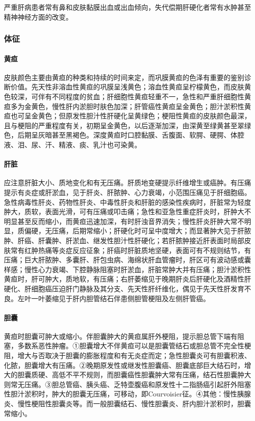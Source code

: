 严重肝病患者常有鼻和皮肤黏膜出血或出血倾向，失代偿期肝硬化者常有水肿甚至精神神经方面的改变。

\subsubsection{体征}

\paragraph{黄疸}

皮肤颜色主要由黄疸的种类和持续的时间来定，而巩膜黄疸的色泽有重要的鉴别诊断价值。先天性非溶血性黄疸的巩膜呈浅黄色；溶血性黄疸呈柠檬黄色，而皮肤黄色较深，可伴有不同程度的贫血；肝细胞性黄疸轻重不一，急性和严重肝细胞性黄疸多为金黄色，慢性肝内淤胆时肤色加深；肝管癌性黄疸呈金黄色；胆汁淤积性黄疸也可呈金黄色；但原发性胆汁性肝硬化呈黄绿色；梗阻性黄疸的皮肤颜色最深，且与梗阻的严重程度有关，初期呈金黄色，以后逐渐加深，由深黄至绿黄甚至翠绿色，后期呈灰暗甚至黑褐色。深度黄疸时口腔黏膜、舌腹面、软腭、硬腭、体腔液、泪、尿、汗、精液、痰、乳汁也可染黄。

\paragraph{肝脏}

应注意肝脏大小、质地变化和有无压痛。肝质地变硬提示纤维增生或癌肿。有压痛提示有炎症或肝淤血，见于肝炎、肝脓肿、心力衰竭，小范围压痛见于肝细胞癌。急性病毒性肝炎、药物性肝炎、中毒性肝炎和肝脏的感染性疾病时，肝脏常为轻度肿大，质软，表面光滑，可有压痛或叩击痛；急性和亚急性重症肝炎时，肝肿大不明显甚至反而缩小，而黄疸迅速加深，有时肝浊音界消失；慢性肝炎肝肿大常不明显，质偏硬，无压痛，后期常缩小；肝硬化时可呈中度增大；而显著肿大见于肝脓肿、肝癌、肝囊肿、肝淤血、继发性胆汁性肝硬化；若肝脓肿接近肝表面时局部皮肤常有红肿热痛等炎症反应征象；肝癌时肝脏质地坚硬，表面可有不规则结节，有压痛；巨大肝脓肿、多囊肝、肝包虫病、海绵状肝血管瘤时，肝区可有波动感或囊样感；慢性心力衰竭、下腔静脉阻塞时肝淤血，肝脏常肿大并有压痛；胆汁淤积性黄疸时，肝可肿大，质地软，有压痛；右肝萎缩见于晚期肝炎后肝硬化及酒精性肝硬化、肝细胞癌压迫肝门静脉及其分支、先天性肝纤维化，偶见于先天性肝发育不良。左叶一叶萎缩见于肝内胆管结石伴患侧胆管梗阻及左侧肝管癌。

\paragraph{胆囊}

黄疸时胆囊可肿大或缩小。伴胆囊肿大的黄疸属肝外梗阻，提示胆总管下端有阻塞，多数系恶性肿瘤。①胆囊增大不伴黄疸可以是胆囊管结石或胆总管不完全性梗阻，增大与否取决于胆囊的膨胀程度和有无炎症而定；急性胆囊炎可有胆囊积液、化脓，胆囊增大有压痛。②晚期原发性或继发性胆囊癌、胆囊底部巨大结石时，增大的胆囊质硬、高低不平不规则，而胆囊癌性胆囊肿大常有压痛，结石性胆囊肿大则常无压痛。③胆总管癌、胰头癌、乏特壶腹癌和原发性十二指肠癌引起肝外阻塞性胆汁淤积时，肿大的胆囊无压痛，可移动，即Courvoisier征。④其他：慢性胰腺炎、慢性梗阻性胆囊炎等。而一般胆囊结石、慢性胆囊炎、肝内胆汁淤积时，胆囊常缩小。

